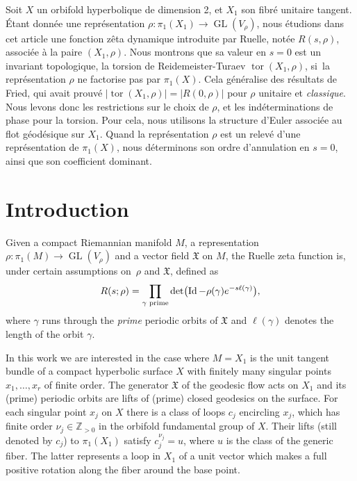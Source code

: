 \documentclass[JEP,XML,SOM,Unicode,NoFloatCountersInSection,published]{cedram}
\theoremstyle{plain}
\theoremstyle{definition}
\theoremstyle{remark}
\newcommand{\Z}{\mathbb{Z}}
\DeclareMathOperator{\GL}{GL}
\DeclareMathOperator{\Id}{Id}
\numberwithin{equation}{section}
\begin{document}


\begin{altabstract}
Soit $X$ un orbifold hyperbolique de dimension 2, et $X_1$ son fibré unitaire tangent. Étant donnée une représentation $\rho \colon \pi_1(X_1)\to \operatorname{GL}(V_\rho)$, nous étudions dans cet article une fonction zêta dynamique introduite par Ruelle, notée $R(s,\rho)$, associée à la paire $(X_1, \rho)$. Nous montrons que sa valeur en $s=0$ est un invariant topologique, la torsion de Reidemeister-Turaev $\operatorname{tor}(X_1, \rho)$, si~la représentation $\rho$ ne factorise pas par $\pi_1(X)$. Cela généralise des résultats de Fried, qui avait prouvé $\left| \operatorname{tor}(X_1, \rho) \right | = \left | R(0,\rho) \right |$ pour $\rho$ unitaire et \emph{classique}. Nous levons donc les restrictions sur le choix de $\rho$, et les indéterminations de phase pour la torsion. Pour cela, nous utilisons la structure d'Euler associée au flot géodésique sur $X_1$. Quand la représentation $\rho$ est un relevé d'une représentation de $\pi_1(X)$, nous déterminons son ordre d'annulation en $s=0$, ainsi que son coefficient dominant.
\end{altabstract}

\maketitle
\vspace*{-\baselineskip}
\tableofcontents
\mainmatter

\section*{Introduction}

Given a compact Riemannian manifold $M$, a representation $\rho \colon \pi_1(M) \to \GL(V_\rho)$ and a vector field $\mathfrak X$ on $M$, the Ruelle zeta function is, under certain assumptions on~$\rho$ and $\mathfrak X$, defined as
\[
R(s;\rho) = \prod_{\gamma \textup{ prime}}\det\bigl(\Id-\rho(\gamma)e^{-s\ell(\gamma)}\bigr),
\]
where $\gamma$ runs through the \emph{prime} periodic orbits of $\mathfrak X$ and $\ell(\gamma)$ denotes the length of the orbit $\gamma$.

In this work we are interested in the case where $M=X_1$ is the unit tangent bundle of a compact hyperbolic surface $X$ with finitely many singular points $x_1, \ldots, x_r$ of finite order. The generator $\mathfrak X$ of the geodesic flow acts on $X_1$ and its (prime) periodic orbits are lifts of (prime) closed geodesics on the surface.
For each singular point $x_j$ on $X$ there is a class of loops $c_j$ encircling $x_j$, which has finite order $\nu_j \in \Z_{>0}$ in the orbifold fundamental group of $X$.
Their lifts (still denoted by $c_j$) to $\pi_1(X_1)$ satisfy $c_j^{\nu_j}= u$,
where $u$ is the class of the generic fiber. The latter represents a loop in $X_1$ of a unit vector which makes a full positive rotation along the fiber around the base point.
\end{document}
